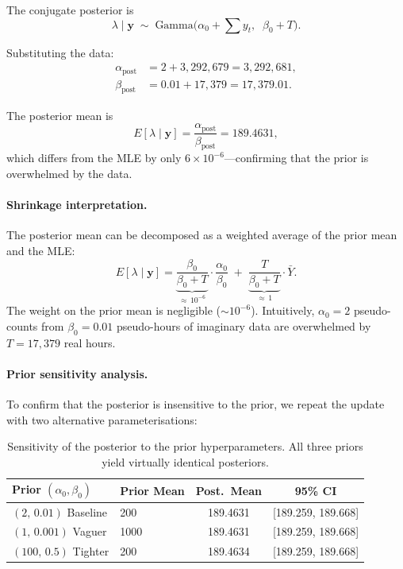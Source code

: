 \documentclass[12pt]{article}
\begin{document}
The conjugate posterior is
\begin{equation}
\lambda \mid \mathbf{y} \;\sim\;
\text{Gamma}\!\bigl(\alpha_0 + \textstyle\sum y_t,\;\;
\beta_0 + T\bigr).
\label{eq:posterior}
\end{equation}

Substituting the data:
\begin{align}
\alpha_{\text{post}} &= 2 + 3{,}292{,}679 = 3{,}292{,}681, \\
\beta_{\text{post}} &= 0.01 + 17{,}379 = 17{,}379.01.
\end{align}

The posterior mean is
\begin{equation}
E[\lambda \mid \mathbf{y}]
= \frac{\alpha_{\text{post}}}{\beta_{\text{post}}}
= 189.4631,
\end{equation}
which differs from the MLE by only $6 \times 10^{-6}$---confirming
that the prior is overwhelmed by the data.

\paragraph{Shrinkage interpretation.}
The posterior mean can be decomposed as a weighted average of the
prior mean and the MLE:
\begin{equation}
E[\lambda \mid \mathbf{y}]
= \underbrace{\frac{\beta_0}{\beta_0 + T}}_{\approx\, 10^{-6}}
  \cdot \frac{\alpha_0}{\beta_0}
\;+\; \underbrace{\frac{T}{\beta_0 + T}}_{\approx\, 1}
  \cdot \bar{Y}.
\end{equation}
The weight on the prior mean is negligible (${\sim}10^{-6}$).
Intuitively, $\alpha_0 = 2$ pseudo-counts from $\beta_0 = 0.01$
pseudo-hours of imaginary data are overwhelmed by $T = 17{,}379$ real
hours.

\paragraph{Prior sensitivity analysis.}
To confirm that the posterior is insensitive to the prior, we repeat
the update with two alternative parameterisations:

\begin{table}[H]
\centering
\caption{Sensitivity of the posterior to the prior hyperparameters.
  All three priors yield virtually identical posteriors.}
\label{tab:sensitivity}
\begin{tabular}{llcc}
\toprule
\textbf{Prior $(\alpha_0, \beta_0)$} & \textbf{Prior Mean}
  & \textbf{Post.\ Mean} & \textbf{95\% CI} \\
\midrule
$(2,\, 0.01)$ Baseline    & 200   & 189.4631 & [189.259, 189.668] \\
$(1,\, 0.001)$ Vaguer     & 1000  & 189.4631 & [189.259, 189.668] \\
$(100,\, 0.5)$ Tighter    & 200   & 189.4634 & [189.259, 189.668] \\
\bottomrule
\end{tabular}
\end{table}
\end{document}
